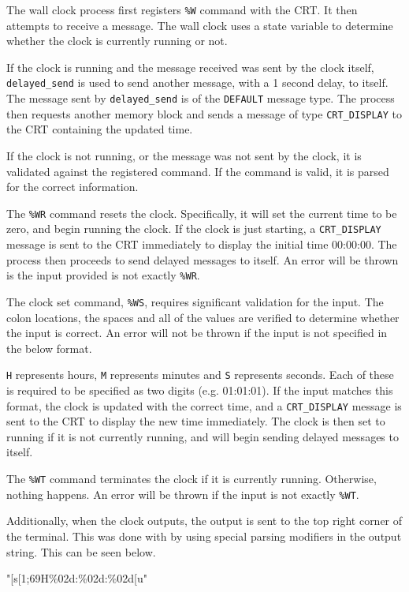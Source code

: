\documentclass[se]{uw-wkrpt}
\begin{document}
The wall clock process first registers \texttt{\%W} command with the CRT. It then attempts to receive a message. The wall clock uses a state variable to determine whether the clock is currently running or not.

If the clock is running and the message received was sent by the clock itself, \texttt{delayed\_send} is used to send another message, with a 1 second delay, to itself. The message sent by \texttt{delayed\_send} is of the \texttt{DEFAULT} message type. The process then requests another memory block and sends a message of type \texttt{CRT\_DISPLAY} to the CRT containing the updated time.

If the clock is not running, or the message was not sent by the clock, it is validated against the registered command. If the command is valid, it is parsed for the correct information.

The \texttt{\%WR} command resets the clock. Specifically, it will set the current time to be zero, and begin running the clock. If the clock is just starting, a \texttt{CRT\_DISPLAY} message is sent to the CRT immediately to display the initial time 00:00:00. The process then proceeds to send delayed messages to itself. An error will be thrown is the input provided is not exactly \texttt{\%WR}.

The clock set command, \texttt{\%WS},  requires significant validation for the input. The colon locations, the spaces and all of the values are verified to determine whether the input is correct. An error will not be thrown if the input is not specified in the below format.
\begin{code}
\end{code}

\texttt{H} represents hours, \texttt{M} represents minutes and \texttt{S} represents seconds. Each of these is required to be specified as two digits (e.g. 01:01:01). If the input matches this format, the clock is updated with the correct time, and a \texttt{CRT\_DISPLAY} message is sent to the CRT to display the new time immediately. The clock is then set to running if it is not currently running, and will begin sending delayed messages to itself.

The \texttt{\%WT} command terminates the clock if it is currently running. Otherwise, nothing happens. An error will be thrown if the input is not exactly \texttt{\%WT}.

Additionally, when the clock outputs, the output is sent to the top right corner of the terminal. This was done with by using special parsing modifiers in the output string. This can be seen below.
\begin{code}
"[s[1;69H\%02d:\%02d:\%02d\n{}[u"
\end{code}
\end{document}
